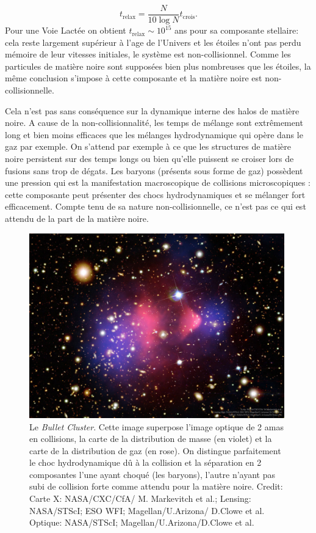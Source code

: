 \begin{equation}
t_\mathrm{relax}=\frac{N}{10\log N} t_\mathrm{crois}.
\end{equation}
Pour une Voie Lactée on obtient $t_\mathrm{relax} \sim 10^{15}$ ans pour sa composante stellaire: cela reste largement supérieur à l'age de l'Univers et les étoiles n'ont pas perdu mémoire de leur vitesses initiales, le système est non-collisionnel. Comme les particules de matière noire sont supposées bien plus nombreuses que les étoiles, la même conclusion s'impose à cette composante et la matière noire est non-collisionnelle.

Cela n'est pas sans conséquence sur la dynamique interne des halos de matière noire. A cause de la non-collisionnalité, les temps de mélange sont extrêmement long et bien moins efficaces que les mélanges hydrodynamique qui opère dans le gaz par exemple. On s'attend par exemple à ce que les structures de matière noire persistent sur des temps longs ou bien qu'elle puissent se croiser lors de fusions sans trop de dégats. Les baryons (présents sous forme de gaz) possèdent une pression qui est la manifestation macroscopique de collisions microscopiques : cette composante peut présenter des chocs hydrodynamiques et se mélanger fort efficacement. Compte tenu de sa nature non-collisionnelle, ce n'est pas ce qui est attendu de la part de la matière noire.


\begin{figure}[htbp]
	\centering
		\includegraphics[height=8cm]{figs/bullet.jpg}
	\caption[Le \textit{Bullet Cluster}]{Le \textit{Bullet Cluster}. Cette image superpose l'image optique de 2 amas en collisions, la carte de la distribution de masse (en violet) et la carte de la distribution de gaz (en rose). On distingue parfaitement le choc hydrodynamique dû à la collision et la séparation en 2 composantes l'une ayant choqué (les baryons), l'autre n'ayant pas subi de collision forte comme attendu pour la matière noire.
Credit: Carte X: NASA/CXC/CfA/ M. Markevitch et al.;  Lensing: NASA/STScI; ESO WFI; Magellan/U.Arizona/ D.Clowe et al. Optique: NASA/STScI; Magellan/U.Arizona/D.Clowe et al.} 
	\label{f:bullet}
\end{figure}

